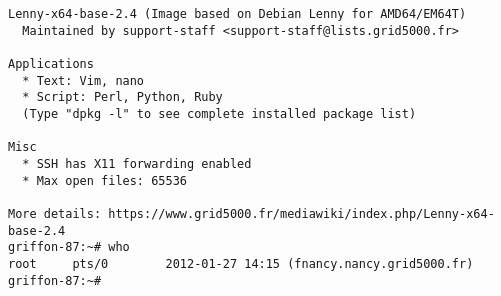 \begin{lstlisting}
Lenny-x64-base-2.4 (Image based on Debian Lenny for AMD64/EM64T)
  Maintained by support-staff <support-staff@lists.grid5000.fr>

Applications
  * Text: Vim, nano
  * Script: Perl, Python, Ruby
  (Type "dpkg -l" to see complete installed package list)

Misc
  * SSH has X11 forwarding enabled
  * Max open files: 65536

More details: https://www.grid5000.fr/mediawiki/index.php/Lenny-x64-base-2.4
griffon-87:~# who
root     pts/0        2012-01-27 14:15 (fnancy.nancy.grid5000.fr)
griffon-87:~# 

\end{lstlisting}
\cleardoublepage
